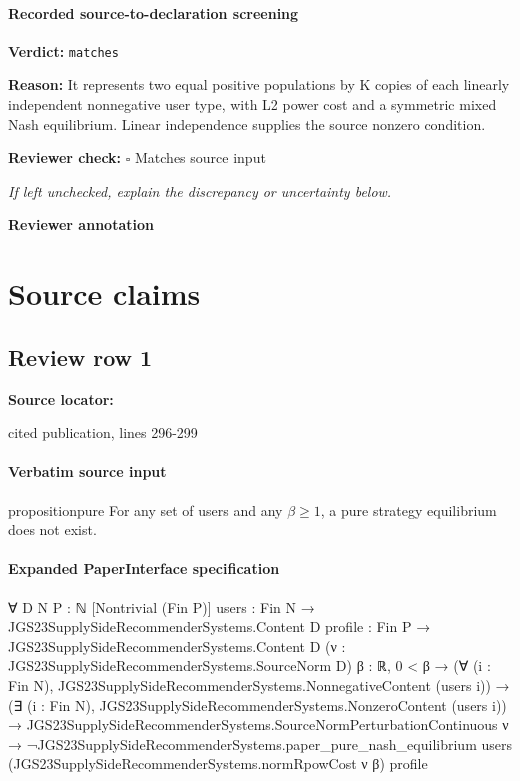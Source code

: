 \documentclass[10pt]{article}
\newcommand{\reviewerbox}{%
  \par\noindent\fbox{\parbox{0.96\linewidth}{\rule{0pt}{0.38in}}}\par
}
\newcommand{\reviewmatch}[1]{%
  \par\noindent\textbf{Reviewer check:} $\square$\; #1\par
  \noindent\emph{If left unchecked, explain the discrepancy or uncertainty below.}\par
}
\begin{document}
\paragraph{Recorded source-to-declaration screening}
\textbf{Verdict:} \texttt{matches}
\\
{\raggedright
\textbf{Reason:} It represents two equal positive populations by K copies of each linearly independent nonnegative user type, with L2 power cost and a symmetric mixed Nash equilibrium.\allowbreak{} Linear independence supplies the source nonzero condition.\allowbreak{}
\par}
\reviewmatch{Matches source input}
\noindent\textbf{Reviewer annotation}\par
\reviewerbox

\clearpage
\hypertarget{source-claim-fd4a3ee6aa2965fe}{}
\hypertarget{source-section-f10b5f68e4acf3dc}{}
\section*{Source claims}
\subsection*{Review row 1}
\textbf{Source locator:} {\footnotesize\raggedright cited publication, lines 296-\allowbreak{}299\par}
\paragraph{Verbatim source input}
\begin{ReviewVerbatim}
\begin{restatable}{proposition}{pure}
\label{prop:pure}
For any set of users and any $\beta \ge 1$, a pure strategy equilibrium does not exist.
\end{restatable}
\end{ReviewVerbatim}



\paragraph{Expanded PaperInterface specification}
\begin{ReviewVerbatim}
∀ {D N P : ℕ} [Nontrivial (Fin P)] {users : Fin N → JGS23SupplySideRecommenderSystems.Content D}
  {profile : Fin P → JGS23SupplySideRecommenderSystems.Content D} (ν : JGS23SupplySideRecommenderSystems.SourceNorm D)
  {β : ℝ},
  0 < β →
    (∀ (i : Fin N), JGS23SupplySideRecommenderSystems.NonnegativeContent (users i)) →
      (∃ (i : Fin N), JGS23SupplySideRecommenderSystems.NonzeroContent (users i)) →
        JGS23SupplySideRecommenderSystems.SourceNormPerturbationContinuous ν →
          ¬JGS23SupplySideRecommenderSystems.paper_pure_nash_equilibrium users
              (JGS23SupplySideRecommenderSystems.normRpowCost ν β) profile
\end{ReviewVerbatim}
\end{document}
